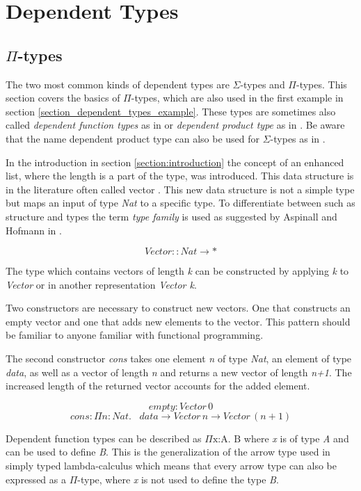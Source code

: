 \section{Dependent Types}\label{section:dependent_types}
\subsection{$\Pi$-types}
The two most common kinds of dependent types are $\Sigma$-types and $\Pi$-types.
This section covers the basics of $\Pi$-types, which are also used in the first example in section \ref{section_dependent_types_example}. 
These types are sometimes also called \emph{dependent function types} as in \cite{10.1145/2841316} or \emph{dependent product type} as in \cite{10.5555/1076265}. 
Be aware that the name dependent product type can also be used for $\Sigma$-types as in \cite{10.1145/2841316}.

In the introduction in section \ref{section:introduction} the concept of an enhanced list, where the length is a part of the type, was introduced.
This data structure is in the literature often called vector \cite{10.1145/2841316} \cite{10.5555/1076265}.
This new data structure is not a simple type but maps an input of type \emph{Nat} to a specific type. 
To differentiate between such as structure and types the term \emph{type family} is used as suggested by Aspinall and Hofmann in \cite{10.5555/1076265}.

$$Vector :: Nat \rightarrow *$$

The type which contains vectors of length \emph{k} can be constructed by applying \emph{k} to \emph{Vector} or in another representation \emph{Vector k}.

Two constructors are necessary to construct new vectors.
One that constructs an empty vector and one that adds new elements to the vector. 
This pattern should be familiar to anyone familiar with functional programming.

The second constructor \emph{cons} takes one element \emph{n} of type \emph{Nat}, an element of type \emph{data}, as well as a vector of length \emph{n} and returns a new vector of length \emph{n+1}. 
The increased length of the returned vector accounts for the added element.

$$empty: Vector \, 0$$
$$cons : \Pi n : Nat. \, \text{ } data \rightarrow Vector \, n \rightarrow Vector \, (n+1)$$

Dependent function types can be described as $\Pi \text{x:A. B}$ where \emph{x} is of type \emph{A} and can be used to define \emph{B}. 
This is the generalization of the arrow type used in simply typed lambda-calculus which means that every arrow type can also be expressed as a $\Pi$-type, where \emph{x} is not used to define the type \emph{B}.

